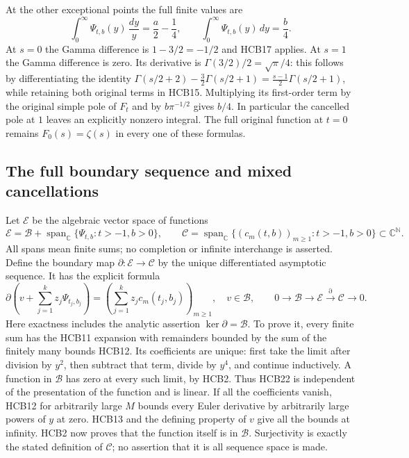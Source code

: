 \documentclass[11pt]{article}
\begin{document}
At the other exceptional points the full finite values are
\begin{equation}\tag{HCB20}
 \int_0^\infty\Psi_{t,b}(y)\,\frac{dy}{y}
           =\frac a2-\frac14,\qquad
 \int_0^\infty\Psi_{t,b}(y)\,dy=\frac b4.
\end{equation}
At $s=0$ the Gamma difference is $1-3/2=-1/2$ and HCB17 applies.
At $s=1$ the Gamma difference is zero. Its derivative is
$\Gamma(3/2)/2=\sqrt\pi/4$: this follows by differentiating the
identity
$\Gamma(s/2+2)-\frac32\Gamma(s/2+1)
=\frac{s-1}{2}\Gamma(s/2+1)$, while retaining both original terms
in HCB15. Multiplying its first-order term by the original simple
pole of $F_t$ and by $b\pi^{-1/2}$ gives $b/4$. In particular the
cancelled pole at $1$ leaves an explicitly nonzero integral. The
full original function at $t=0$ remains $F_0(s)=\zeta(s)$ in every
one of these formulas.

\subsection{The full boundary sequence and mixed cancellations}

Let $\mathcal E$ be the algebraic vector space of functions
\begin{equation}\tag{HCB21}
 \mathcal E=\mathcal B+
       \operatorname{span}_{\mathbb C}\{\Psi_{t,b}:t>-1,b>0\},
 \qquad
 \mathcal C=\operatorname{span}_{\mathbb C}
       \{(c_m(t,b))_{m\geq1}:t>-1,b>0\}\subset\mathbb C^{\mathbb N}.
\end{equation}
All spans mean finite sums; no completion or infinite interchange
is asserted. Define the boundary map $\partial:\mathcal E\to
\mathcal C$ by the unique differentiated asymptotic sequence. It
has the explicit formula
\begin{equation}\tag{HCB22}
 \partial\left(v+\sum_{j=1}^k z_j\Psi_{t_j,b_j}\right)
    =\left(\sum_{j=1}^k z_jc_m(t_j,b_j)\right)_{m\geq1},
 \quad v\in\mathcal B,
 \qquad
 0\longrightarrow\mathcal B\longrightarrow\mathcal E
       \xrightarrow{\partial}\mathcal C\longrightarrow0.
\end{equation}
Here exactness includes the analytic assertion
$\ker\partial=\mathcal B$. To prove it, every finite sum has the
HCB11 expansion with remainders bounded by the sum of the finitely
many bounds HCB12. Its coefficients are unique: first take the
limit after division by $y^2$, then subtract that term, divide by
$y^4$, and continue inductively. A function in $\mathcal B$ has
zero at every such limit, by HCB2. Thus HCB22 is independent of
the presentation of the function and is linear. If all the
coefficients vanish, HCB12 for arbitrarily large $M$ bounds every
Euler derivative by arbitrarily large powers of $y$ at zero.
HCB13 and the defining property of $v$ give all the bounds at
infinity. HCB2 now proves that the function itself is in
$\mathcal B$. Surjectivity is exactly the stated definition of
$\mathcal C$; no assertion that it is all sequence space is made.
\end{document}
